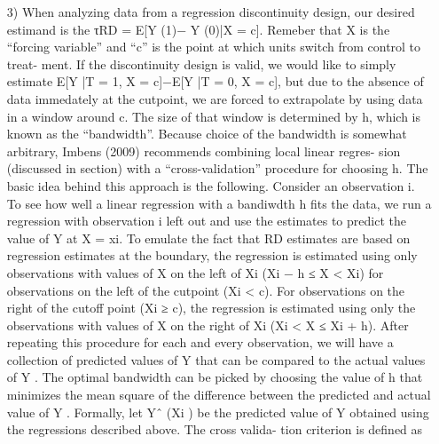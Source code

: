 \documentclass{article}
\begin{document}
\begin{itemize}
\item[3)]  When analyzing data from a regression discontinuity design, our desired estimand is the τRD = E[Y (1)− Y (0)|X = c]. Remeber that X is the “forcing variable” and “c” is the point at which units switch from control to treat- ment. If the discontinuity design is valid, we would like to simply estimate E[Y |T = 1, X = c]−E[Y |T = 0, X = c], but due to the absence of data immedately at the cutpoint, we are forced to extrapolate by using data in a window around c. The size of that window is determined by h, which is known as the “bandwidth”.
Because choice of the bandwidth is somewhat arbitrary, Imbens (2009) recommends combining local linear regres- sion (discussed in section) with a “cross-validation” procedure for choosing h. The basic idea behind this approach is the following. Consider an observation i. To see how well a linear regression with a bandiwdth h fits the data, we run a regression with observation i left out and use the estimates to predict the value of Y at X = xi. To emulate the fact that RD estimates are based on regression estimates at the boundary, the regression is estimated using only observations with values of X on the left of Xi (Xi − h ≤ X < Xi) for observations on the left of the cutpoint (Xi < c). For observations on the right of the cutoff point (Xi ≥ c), the regression is estimated using only the observations with values of X on the right of Xi (Xi < X ≤ Xi + h).
After repeating this procedure for each and every observation, we will have a collection of predicted values of Y that can be compared to the actual values of Y . The optimal bandwidth can be picked by choosing the value of h that minimizes the mean square of the difference between the predicted and actual value of Y .
Formally, let Yˆ (Xi ) be the predicted value of Y obtained using the regressions described above. The cross valida-
tion criterion is defined as

 
\end{itemize}     
\end{document}
